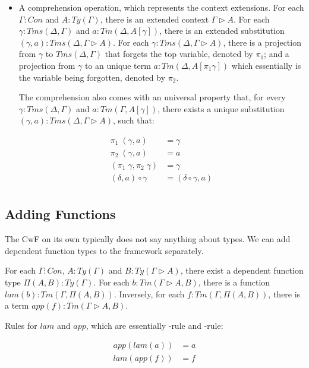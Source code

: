 {\begin{itemize}
\item{A comprehension operation, which represents the context extensions. For each $\Gamma : Con$ and $A : Ty(\Gamma)$, there is an extended context $\Gamma \triangleright A$. For each $\gamma : Tms (\Delta, \Gamma)$ and $a : Tm (\Delta, A[\gamma])$, there is an extended substitution $(\gamma, a) : Tms (\Delta, \Gamma \triangleright A)$. For each $\gamma : Tms (\Delta, \Gamma \triangleright A)$, there is a projection from $\gamma$ to $Tms (\Delta, \Gamma)$ that forgets the top variable, denoted by $\pi_1$; and a projection from $\gamma$ to an unique term $a : Tm (\Delta, A[\pi_1 \gamma])$ which essentially is the variable being forgotten, denoted by $\pi_2$.

The comprehension also comes with an universal property that, for every $\gamma : Tms (\Delta, \Gamma)$ and $a : Tm(\Gamma , A[\gamma])$, there exists a unique substitution $(\gamma, a) : Tms (\Delta, \Gamma \triangleright A)$, such that:

  \begin{align*}
    \pi_1\;(\gamma, a) & = \gamma \\
    \pi_2\;(\gamma, a) & = a \\
    (\pi_1\;\gamma , \pi_2\;\gamma) & = \gamma \\
    (\delta, a) \circ \gamma & = (\delta \circ \gamma , a) \\
  \end{align*}
  }
  
\end{itemize}

\subsection{Adding Functions}

The CwF on its own typically does not say anything about types. We can add dependent function types to the framework separately.

For each $\Gamma : Con$, $A : Ty(\Gamma)$ and $B : Ty(\Gamma \triangleright A)$, there exist a dependent function type $\Pi (A, B) : Ty(\Gamma)$. For each $b : Tm(\Gamma \triangleright A, B)$, there is a function $lam(b) : Tm (\Gamma, \Pi (A, B))$. Inversely, for each $f : Tm(\Gamma, \Pi (A, B))$, there is a term $app(f) : Tm(\Gamma \triangleright A, B)$.

Rules for $lam$ and $app$, which are essentially \beta-rule and \eta-rule:

\begin{align*}
  app (lam (a)) & = a \\
  lam (app (f)) & = f \\
\end{align*}

}
